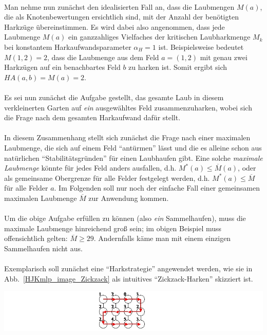 \documentclass[fontsize=12pt,doubleside,openany,listof=totoc,listof=flat,listof=nochaptergap,numbers=noenddot]{scrbook}
\theoremstyle{style}
\begin{document}
\phantom \\
\noindent Man nehme nun zunächst den idealisierten Fall an, dass die Laubmengen $M(a)$, 
die als Knotenbewertungen ersichtlich sind, mit der Anzahl der benötigten 
Harkzüge übereinstimmen. Es wird dabei also angenommen, dass jede Laubmenge 
$M(a)$ ein ganzzahliges Vielfaches der kritischen Laubharkmenge $M_k$ bei 
konstantem Harkaufwandsparameter $\alpha_H=1$ ist. Beispielsweise bedeutet 
$M(1,2)=2$, dass die Laubmenge aus dem Feld $a=(1,2)$ mit genau zwei Harkzügen 
auf ein benachbartes Feld $b$ zu harken ist. Somit ergibt sich $HA(a,b)=M(a)=2$.
\\ \\
Es sei nun zunächst die Aufgabe gestellt, das gesamte Laub in diesem 
verkleinerten Garten auf \textit{ein} ausgewähltes Feld zusammenzuharken, wobei
sich die Frage nach dem gesamten Harkaufwand dafür stellt. 
\\ \\
In diesem Zusammenhang stellt sich zunächst die Frage nach einer 
maximalen Laubmenge, die sich auf einem Feld "`antürmen"' lässt und 
die es alleine schon aus natürlichen "`Stabilitätsgründen"' für einen
Laubhaufen gibt. Eine solche \textit{maximale Laubmenge}\label{maximale Laubmenge} könnte für jedes Feld anders ausfallen, d.h. $M^*(a) \leq \overline{M}(a)$, oder als gemeinsame Obergrenze für alle Felder festgelegt werden, d.h. $M^*(a) \leq \overline{M}$ für alle Felder $a$. Im
Folgenden soll nur noch der einfache Fall einer gemeinsamen maximalen Laubmenge $\overline{M}$ zur Anwendung kommen. 
\\ \\
Um die obige Aufgabe erfüllen zu können (also \textit{ein} Sammelhaufen), muss 
die maximale Laubmenge hinreichend groß sein; im obigen Beispiel muss 
offensichtlich gelten: $\overline{M} \geq 29$. Andernfalls käme man mit einem
einzigen Sammelhaufen nicht aus.
\\ \\
Exemplarisch soll zunächst eine "`Harkstrategie"' angewendet werden, wie sie in 
Abb.~\ref{HJKmlp_image_Zickzack} als intuitives "`Zickzack-Harken"' skizziert ist. 

\begin{center}
\begin{minipage}{\textwidth}
\centerline{\includegraphics[angle=0,scale=0.85]{Figures/Laub/Zickzack.jpg}}
\label{HJKmlp_image_Zickzack}
\end{minipage}
\end{center}
\end{document}
